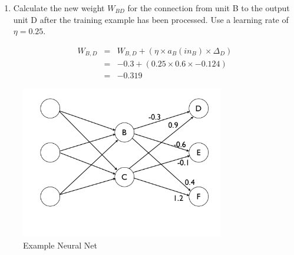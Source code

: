 \documentclass[solution]{ditpaper}
\begin{document}
\begin{enumerate}
\begin{enumerate}
%
%
	\item Calculate the new weight $W_{BD}$ for the connection from unit B to the output unit D after the training example has been processed. Use a learning rate of $\eta = 0.25$.
		\begin{answer}
		\begin{eqnarray*}			
		W_{B,D} &=& W_{B,D} + (\eta \times a_B(in_B) \times \Delta_D)\\
				&=& -0.3 + (0.25 \times 0.6 \times -0.124)\\
		           &=& -0.319
		\end{eqnarray*}
	\end{answer}
\end{enumerate}

\end{enumerate}

\clearpage
\newpage

\begin{figure}[htbp]
\begin{center}
\includegraphics[width=3.5in]{./images/backpropnetwork1.png}
\caption{Example Neural Net}
\label{fig:nn}
\end{center}
\end{figure}
\end{document}
